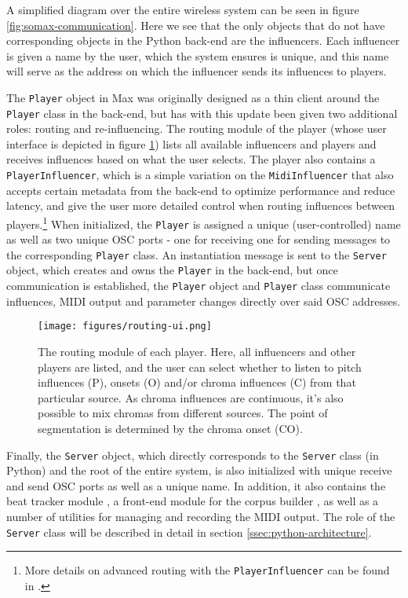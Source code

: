 A simplified diagram over the entire wireless system can be seen in figure \ref{fig:somax-communication}. Here we see that the only objects that do not have corresponding objects in the Python back-end are the influencers. Each influencer is given a name by the user, which the system ensures is unique, and this name will serve as the address on which the influencer sends its influences to players. 

The \texttt{Player} object in Max was originally designed as a thin client around the \texttt{Player} class in the back-end, but has with this update been given two additional roles: routing and re-influencing. The routing module of the player (whose user interface is depicted in figure \ref{fig:routing-ui}) lists all available influencers and players and receives influences based on what the user selects. The player also contains a \texttt{PlayerInfluencer}, which is a simple variation on the \texttt{MidiInfluencer} that also accepts certain metadata from the back-end to optimize performance and reduce latency, and give the user more detailed control when routing influences between players.\footnote{More details on advanced routing with the \texttt{PlayerInfluencer} can be found in \cite{somaxoverview2021}.} When initialized, the \texttt{Player} is assigned a unique (user-controlled) name as well as two unique OSC ports - one for receiving one for sending messages to the corresponding \texttt{Player} class. An instantiation message is sent to the \texttt{Server} object, which creates and owns the \texttt{Player} in the back-end, but once communication is established, the \texttt{Player} object and \texttt{Player} class communicate influences, MIDI output and parameter changes directly over said OSC addresses. 

 \begin{figure}[h!]
    \centering        
 	\texttt{[image: figures/routing-ui.png]}
    \caption{The routing module of each player. Here, all influencers and other players are listed, and the user can select whether to listen to pitch influences (P), onsets (O) and/or chroma influences (C) from that particular source. As chroma influences are continuous, it's also possible to mix chromas from different sources. The point of segmentation is determined by the chroma onset (CO).}
    \label{fig:routing-ui}
\end{figure}

Finally, the \texttt{Server} object, which directly corresponds to the \texttt{Server} class (in Python) and the root of the entire system, is also initialized with unique receive and send OSC ports as well as a unique name. In addition, it also contains the beat tracker module \cite{bonnasse2010donner}, a front-end module for the corpus builder , as well as a number of utilities for managing and recording the MIDI output. The role of the \texttt{Server} class will be described in detail in section \ref{ssec:python-architecture}.

